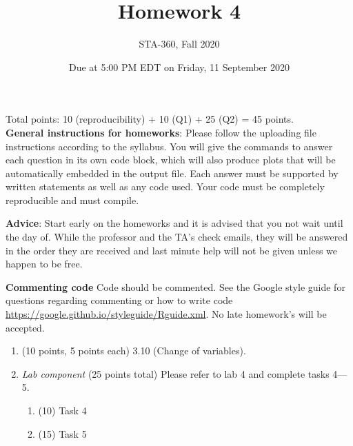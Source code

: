 \documentclass{article}
\begin{document}
\title{Homework 4}
\author{STA-360, Fall 2020}
\date{Due at 5:00 PM EDT on Friday, 11 September 2020}
\maketitle

Total points: 10 (reproducibility) + 10 (Q1) + 25 (Q2) = 45 points. \\

\textbf{General instructions for homeworks}: Please follow the uploading file instructions according to the syllabus. You will give the commands to answer each question in its own code block, which will also produce plots that will be automatically embedded in the output file. Each answer must be supported by written statements as well as any code used. Your code must be completely reproducible and must compile. 

\textbf{Advice}: Start early on the homeworks and it is advised that you not wait until the day of. While the professor and the TA's check emails, they will be answered in the order they are received and last minute help will not be given unless we happen to be free.  

\textbf{Commenting code}
Code should be commented. See the Google style guide for questions regarding commenting or how to write 
code \url{https://google.github.io/styleguide/Rguide.xml}. No late homework's will be accepted.


\begin{enumerate}
\item (10 points, 5 points each) 3.10 (Change of variables).


\item {\em Lab component} 
  (25 points total) Please refer to lab 4 and complete tasks 4---5. 
  \begin{enumerate}
  \item (10) Task 4
  \item (15) Task 5
  \end{enumerate}
  
\end{enumerate}
\end{document}
